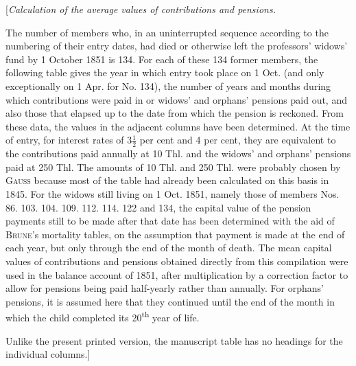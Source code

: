 \Needspace{75pt}
\begin{center}[\textit{Calculation of the average values of contributions and pensions.}\end{center}
\noindent\hspace*{\parindent}The number of members who, in an uninterrupted sequence according to the numbering of their entry dates, had died or otherwise left the professors' widows' fund by 1 October 1851 is 134. For each of these 134 former members, the following table gives the year in which entry took place on 1 Oct. (and only exceptionally on 1 Apr. for No. 134), the number of years and months during which contributions were paid in or widows' and orphans' pensions paid out, and also those that elapsed up to the date from which the pension is reckoned. From these data, the values in the adjacent columns have been determined. At the time of entry, for interest rates of \(3\tfrac{1}{2}\) per cent and 4 per cent, they are equivalent to the contributions paid annually at 10 Thl. and the widows' and orphans' pensions paid at 250 Thl. The amounts of 10 Thl. and 250 Thl. were probably chosen by \textsc{Gauss} because most of the table had already been calculated on this basis in 1845. For the widows still living on 1 Oct. 1851, namely those of members Nos. 86. 103. 104. 109. 112. 114. 122 and 134, the capital value of the pension payments still to be made after that date has been determined with the aid of \textsc{Brune}'s mortality tables, on the assumption that payment is made at the end of each year, but only through the end of the month of death. The mean capital values of contributions and pensions obtained directly from this compilation were used in the balance account of 1851, after multiplication by a correction factor to allow for pensions being paid half-yearly rather than annually. For orphans' pensions, it is assumed here that they continued until the end of the month in which the child completed its 20\textsuperscript{th} year of life.

Unlike the present printed version, the manuscript table has no headings for the individual columns.]
